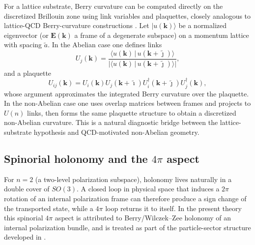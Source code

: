 For a lattice substrate, Berry curvature can be computed directly on the discretized Brillouin zone using
link variables and plaquettes, closely analogous to lattice-QCD Berry-curvature constructions
\citep{Fukui2005ChernDiscretizedBZ,PuYamamoto2018BerryLatticeQCD,Yamamoto2016BerryPhaseLatticeQCD}.
Let $\lvert u(\mathbf{k})\rangle$ be a normalized eigenvector (or $\mathbf{E}(\mathbf{k})$ a frame of a degenerate
subspace) on a momentum lattice with spacing $\tilde a$.
In the Abelian case one defines links
\begin{equation}
  U_j(\mathbf{k})=\frac{\langle u(\mathbf{k})\,|\,u(\mathbf{k}+\tilde{\jmath})\rangle}
  {|\langle u(\mathbf{k})\,|\,u(\mathbf{k}+\tilde{\jmath})\rangle|},
\end{equation}
and a plaquette
\begin{equation}
  U_{ij}(\mathbf{k}) = U_i(\mathbf{k})U_j(\mathbf{k}+\tilde{\imath})
  U_i^\dagger(\mathbf{k}+\tilde{\jmath})U_j^\dagger(\mathbf{k}),
\end{equation}
whose argument approximates the integrated Berry curvature over the plaquette.
In the non-Abelian case one uses overlap matrices between frames and projects to $U(n)$ links, then forms the same
plaquette structure to obtain a discretized non-Abelian curvature.
This is a natural diagnostic bridge between the lattice-substrate hypothesis and QCD-motivated non-Abelian geometry.

\subsection{\texorpdfstring{Spinorial holonomy and the $4\pi$ aspect}{Spinorial holonomy and the 4pi aspect}}

For $n=2$ (a two-level polarization subspace), holonomy lives naturally in a double cover of $SO(3)$.
A closed loop in physical space that induces a $2\pi$ rotation of an internal polarization frame can therefore
produce a sign change of the transported state, while a $4\pi$ loop returns it to itself.
In the present theory this spinorial $4\pi$ aspect is attributed to Berry/Wilczek--Zee holonomy of an internal
polarization bundle, and is treated as part of the particle-sector structure developed in .

